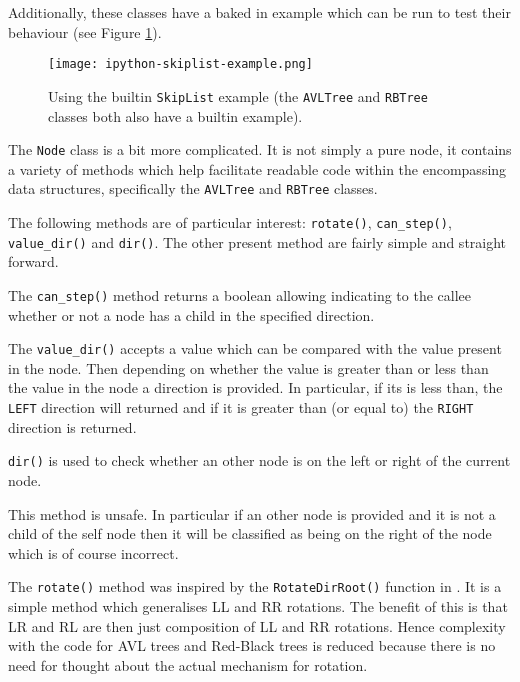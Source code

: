 \documentclass[article]{uom-coursework}
\begin{document}
Additionally, these classes have a baked in example which can be
run to test their behaviour (see Figure \ref{fig:example}).

\begin{figure}[H]
\centering
\texttt{[image: ipython-skiplist-example.png]}
\caption{Using the builtin \texttt{SkipList} example (the
\texttt{AVLTree} and \texttt{RBTree} classes both also have a
builtin example).}
\label{fig:example}
\end{figure}

The \texttt{Node} class is a bit more complicated. It is not
simply a pure node, it contains a variety of methods which help
facilitate readable code within the encompassing data
structures, specifically the \texttt{AVLTree} and
\texttt{RBTree} classes.

The following methods are of particular interest:
\texttt{rotate()}, \texttt{can\_step()}, \texttt{value\_dir()}
and \texttt{dir()}. The other present method are fairly simple
and straight forward.

The \texttt{can\_step()} method returns a boolean allowing
indicating to the callee whether or not a node has a child in
the specified direction.

The \texttt{value\_dir()} accepts a value which can be compared
with the value present in the node. Then depending on whether
the value is greater than or less than the value in the node a
direction is provided. In particular, if its is less than, the
\texttt{LEFT} direction will returned and if it is greater than
(or equal to) the \texttt{RIGHT} direction is returned.

\texttt{dir()} is used to check whether an other node is on the
left or right of the current node.

\begin{note}
This method is unsafe. In particular if an other node is
provided and it is not a child of the self node then it will be
classified as being on the right of the node which is of course
incorrect.
\end{note}

The \texttt{rotate()} method was inspired by the
\texttt{RotateDirRoot()} function in \textcite{wikirbtree}. It
is a simple method which generalises LL and RR rotations. The
benefit of this is that LR and RL are then just composition of
LL and RR rotations. Hence complexity with the code for AVL
trees and Red-Black trees is reduced because there is no need
for thought about the actual mechanism for rotation.
\end{document}
